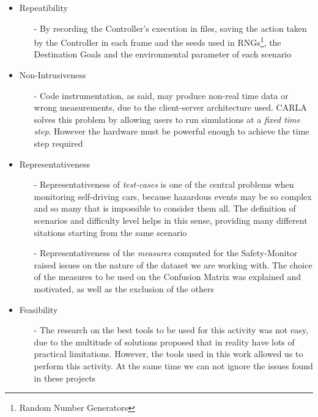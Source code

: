 \begin{itemize}
	\item Repeatibility
	\begin{itemize}
		\item[-] By recording the Controller's execution in files, saving the action taken by the Controller in each frame and the seeds used in RNGs\footnote{Random Number Generators}, the Destination Goals and the environmental parameter of each scenario
	\end{itemize}
	\item Non-Intrusiveness
	\begin{itemize}
		\item[-] Code instrumentation, as said, may produce non-real time data or wrong measurements, due to the client-server architecture used. CARLA solves this problem by allowing users to run simulations at a \textsl{fixed time step}. However the hardware must be powerful enough to achieve the time step required
	\end{itemize}
	\item Representativeness
	\begin{itemize}
		\item[-] Representativeness of \textsl{test-cases} is one of the central problems when monitoring self-driving cars, because hazardous events may be so complex and so many that is impossible to consider them all. The definition of scenarios and difficulty level helps in this sense, providing many different sitations starting from the same scenario
		\item[-] Representativeness of the \textsl{measures} computed for the Safety-Monitor raised issues on the nature of the dataset we are working with. The choice of the measures to be used on the Confusion Matrix was explained and motivated, as well as the exclusion of the others
	\end{itemize}
	\item Feasibility
	\begin{itemize}
		\item[-] The research on the best tools to be used for this activity was not easy, due to the multitude of solutions proposed that in reality have lots of practical limitations. However, the tools used in this work allowed us to perform this activity. At the same time we can not ignore the issues found in these projects
	\end{itemize}

\end{itemize}

